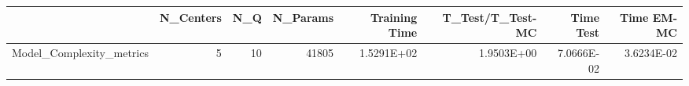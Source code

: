 \begin{tabular}{lrrrrrrr}
\toprule
{} &  N\_Centers &  N\_Q &  N\_Params &  Training Time &  T\_Test/T\_Test-MC &  Time Test &  Time EM-MC \\
\midrule
Model\_Complexity\_metrics &          5 &   10 &     41805 &     1.5291E+02 &        1.9503E+00 & 7.0666E-02 &  3.6234E-02 \\
\bottomrule
\end{tabular}
